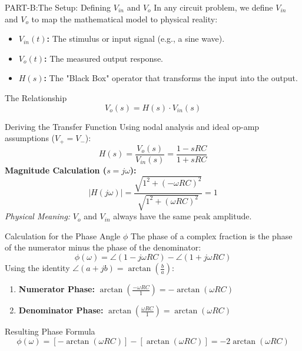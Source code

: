 \documentclass{beamer}
\begin{document}
\begin{frame}{PART-B:The Setup: Defining $V_{in}$ and $V_o$}
    In any circuit problem, we define $V_{in}$ and $V_o$ to map the mathematical model to physical reality:
    \vfill
    \begin{itemize}
        \item \textbf{$V_{in}(t)$:} The stimulus or input signal (e.g., a sine wave).
        \item \textbf{$V_o(t)$:} The measured output response.
        \item \textbf{$H(s)$:} The "Black Box" operator that transforms the input into the output.
    \end{itemize}
    \vfill
    \begin{block}{The Relationship}
        \[ V_o(s) = H(s) \cdot V_{in}(s) \]
    \end{block}
\end{frame}

\begin{frame}{ Deriving the Transfer Function}
    Using nodal analysis and ideal op-amp assumptions ($V_+ = V_-$):
    \vfill
    \begin{equation}
        H(s) = \frac{V_o(s)}{V_{in}(s)} = \frac{1 - sRC}{1 + sRC}
    \end{equation}
    \vfill
    \textbf{Magnitude Calculation ($s = j\omega$):}
    \[ |H(j\omega)| = \frac{\sqrt{1^2 + (-\omega RC)^2}}{\sqrt{1^2 + (\omega RC)^2}} = 1 \]
    \vfill
    \textit{Physical Meaning:} $V_o$ and $V_{in}$ always have the same peak amplitude.
\end{frame}
\begin{frame}{Calculation for the Phase Angle $\phi$}
    The phase of a complex fraction is the phase of the numerator minus the phase of the denominator:
    \[ \phi(\omega) = \angle(1 - j\omega RC) - \angle(1 + j\omega RC) \]
    \vfill
    Using the identity $\angle(a + jb) = \arctan\left(\frac{b}{a}\right)$:
    \begin{enumerate}
        \item \textbf{Numerator Phase:} $\arctan\left(\frac{-\omega RC}{1}\right) = -\arctan(\omega RC)$
        \item \textbf{Denominator Phase:} $\arctan\left(\frac{\omega RC}{1}\right) = \arctan(\omega RC)$
    \end{enumerate}
    \vfill
    \begin{block}{Resulting Phase Formula}
        \[ \phi(\omega) = [-\arctan(\omega RC)] - [\arctan(\omega RC)] = -2\arctan(\omega RC) \]
    \end{block}
\end{frame}
\end{document}

